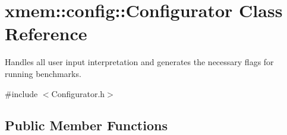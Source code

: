 \hypertarget{classxmem_1_1config_1_1_configurator}{\section{xmem\-:\-:config\-:\-:Configurator Class Reference}
\label{classxmem_1_1config_1_1_configurator}
}


Handles all user input interpretation and generates the necessary flags for running benchmarks.  




{\ttfamily \#include $<$Configurator.\-h$>$}

\subsection*{Public Member Functions}
